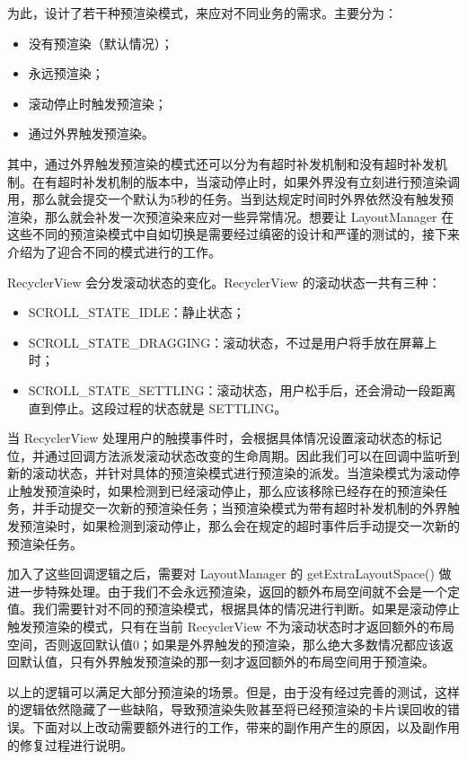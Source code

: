 为此，设计了若干种预渲染模式，来应对不同业务的需求。主要分为：

\begin{itemize}
    \item 没有预渲染（默认情况）；
    \item 永远预渲染；
    \item 滚动停止时触发预渲染；
    \item 通过外界触发预渲染。
\end{itemize}

其中，通过外界触发预渲染的模式还可以分为有超时补发机制和没有超时补发机制。在有超时补发机制的版本中，当滚动停止时，如果外界没有立刻进行预渲染调用，那么就会提交一个默认为5秒的任务。当到达规定时间时外界依然没有触发预渲染，那么就会补发一次预渲染来应对一些异常情况。想要让 LayoutManager 在这些不同的预渲染模式中自如切换是需要经过缜密的设计和严谨的测试的，接下来介绍为了迎合不同的模式进行的工作。

RecyclerView 会分发滚动状态的变化。RecyclerView 的滚动状态一共有三种：

\begin{itemize}
    \item SCROLL\_STATE\_IDLE：静止状态；
    \item SCROLL\_STATE\_DRAGGING：滚动状态，不过是用户将手放在屏幕上时；
    \item SCROLL\_STATE\_SETTLING：滚动状态，用户松手后，还会滑动一段距离直到停止。这段过程的状态就是 SETTLING。
\end{itemize}

当 RecyclerView 处理用户的触摸事件时，会根据具体情况设置滚动状态的标记位，并通过回调方法派发滚动状态改变的生命周期。因此我们可以在回调中监听到新的滚动状态，并针对具体的预渲染模式进行预渲染的派发。当渲染模式为滚动停止触发预渲染时，如果检测到已经滚动停止，那么应该移除已经存在的预渲染任务，并手动提交一次新的预渲染任务；当预渲染模式为带有超时补发机制的外界触发预渲染时，如果检测到滚动停止，那么会在规定的超时事件后手动提交一次新的预渲染任务。

加入了这些回调逻辑之后，需要对 LayoutManager 的 getExtraLayoutSpace() 做进一步特殊处理。由于我们不会永远预渲染，返回的额外布局空间就不会是一个定值。我们需要针对不同的预渲染模式，根据具体的情况进行判断。如果是滚动停止触发预渲染的模式，只有在当前 RecyclerView 不为滚动状态时才返回额外的布局空间，否则返回默认值0；如果是外界触发的预渲染，那么绝大多数情况都应该返回默认值，只有外界触发预渲染的那一刻才返回额外的布局空间用于预渲染。

以上的逻辑可以满足大部分预渲染的场景。但是，由于没有经过完善的测试，这样的逻辑依然隐藏了一些缺陷，导致预渲染失败甚至将已经预渲染的卡片误回收的错误。下面对以上改动需要额外进行的工作，带来的副作用产生的原因，以及副作用的修复过程进行说明。

